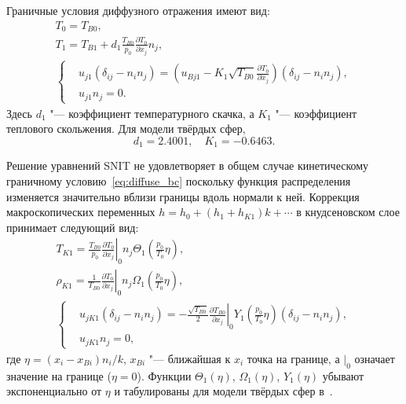 \documentclass[10pt]{article}
\newcommand{\pder}[2][]{\frac{\partial#1}{\partial#2}}
\begin{document}
Граничные условия диффузного отражения имеют вид:
\begin{gather}
    T_0 = T_{B0}, \label{eq:bc_T0} \\
    T_1 = T_{B1} + d_1\frac{T_{B0}}{p_0}\pder[T_0]{x_j} n_j, \label{eq:bc_T1} \\
    \left\{
    \begin{aligned}
        & u_{j1} (\delta_{ij}-n_in_j) =
            \left(u_{Bj1} - K_1 \sqrt{T_{B0}} \pder[T_0]{x_j}\right) (\delta_{ij}-n_in_j), \\
        & u_{j1} n_j = 0.
    \end{aligned}
    \right. \label{eq:bc_u1}
\end{gather}
Здесь \(d_1\) "--- коэффициент температурного скачка, а \(K_1\) "--- коэффициент теплового скольжения.
Для модели твёрдых сфер,
\begin{equation}\label{eq:slip_coefficients}
    d_1 = 2.4001, \quad K_1 = -0.6463.
\end{equation}

Решение уравнений SNIT не удовлетворяет в общем случае кинетическому граничному условию~\eqref{eq:diffuse_bc}
поскольку функция распределения изменяется значительно вблизи границы вдоль нормали к ней.
Коррекция макроскопических переменных \(h = h_0 + (h_1 + h_{K1})k + \cdots\) в кнудсеновском слое
принимает следующий вид:
\begin{gather}
    T_{K1} = \frac{T_{B0}}{p_0}\left.\pder[T_0]{x_j}\right|_0 n_j
        \Theta_1\left(\frac{p_0}{T_0}\eta\right), \label{eq:correction_T} \\
    \rho_{K1} = \frac1{T_{B0}}\left.\pder[T_0]{x_j}\right|_0 n_j
        \Omega_1\left(\frac{p_0}{T_0}\eta\right), \label{eq:correction_rho} \\
    \left\{
    \begin{aligned}
        & u_{jK1} (\delta_{ij}-n_in_j) =
            -\frac{\sqrt{T_{B0}}}2 \left.\pder[T_{B0}]{x_j}\right|_0
            Y_1\left(\frac{p_0}{T_0}\eta\right) (\delta_{ij}-n_in_j), \\
        & u_{jK1} n_j = 0,
    \end{aligned}
    \right. \label{eq:correction_u}
\end{gather}
где \(\eta = (x_i-x_{Bi})n_i/k\), \(x_{Bi}\) "--- ближайшая к \(x_i\) точка на границе,
а \(|_0\) означает значение на границе (\(\eta=0\)).
Функции \(\Theta_1(\eta)\), \(\Omega_1(\eta)\), \(Y_1(\eta)\) убывают экспоненциально от \(\eta\)
и табулированы для модели твёрдых сфер в~\cite{Sone2002, Sone2007}.
\end{document}
